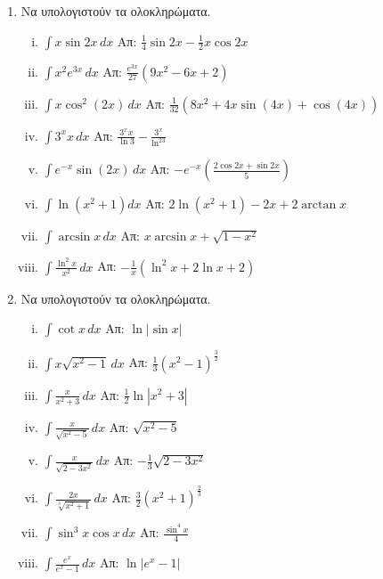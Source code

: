 \begin{enumerate}
  \item Να υπολογιστούν τα ολοκληρώματα.
    \begin{enumerate}[i)]
      \item $\int x\sin2x \, dx$ \hfill Απ: $\frac{1}{4}\sin2x-\frac{1}{2}x\cos2x$
      \item $\int x^2e^{3x} \, dx$ \hfill Απ: $\frac{e^{3x}}{27}(9x^2-6x+2)$
      \item $ \int x \cos^{2}{(2x)} \,{dx} $ 
        \hfill Απ: $ \frac{1}{32} (8x^{2}+4x \sin{(4x)} + \cos{(4x)}) $
      \item $\int 3^{x}x \, dx$ \hfill Απ: $\frac{3^xx}{\ln3}-\frac{3^x}{\ln^23}$
      \item $\int e^{-x}\sin(2x) \, dx$ 
        \hfill Απ: $-e^{-x}\left(\frac{2\cos2x+\sin2x}{5}\right)$
      \item $\int \ln(x^{2}+1) dx $ \hfill Απ: $2\ln(x^{2}+1)-2x+2\arctan x$
      \item $\int \arcsin x \, dx$ \hfill Απ: $x\arcsin x + \sqrt{1-x^2}$
      \item $\int \frac{\ln^2x}{x^2} \, dx$ \hfill Απ: $-\frac{1}{x}(\ln^2x+2\ln x+2)$
    \end{enumerate}

\enlargethispage{4\baselineskip}

  \item Να υπολογιστούν τα ολοκληρώματα.
    \begin{enumerate}[i)]
      \item $\int \cot x \, dx$ \hfill Απ: $\ln|\sin x|$ 
      \item $ \int x \sqrt{x^{2}-1} \,{dx} $ 
        \hfill Απ: $ \frac{1}{3} (x^{2}-1)^{\frac{3}{2}} $  
      \item $\int\frac{x}{x^2+3} \, dx$ \hfill Απ: $\frac{1}{2}\ln|x^2+3|$
      \item $\int\frac{x}{\sqrt{x^{2}-5}} \, dx$ \hfill Απ: $ \sqrt{x^{2}-5} $
      \item $\int\frac{x}{\sqrt{2-3x^{2}}} \, dx$ \hfill Απ: $ - \frac{1}{3}
      \sqrt{2-3x^{2}} $
      \item $ \int \frac{2x}{\sqrt[3]{x^{2}+1}} \,{dx} $ 
        \hfill Απ: $ \frac{3}{2} (x^{2}+1)^{\frac{2}{3}} $ 
      \item $\int \sin^3x\cos x \, dx$ \hfill Απ: $\frac{\sin^{4}x}{4}$
      \item $\int \frac{e^x}{e^x-1} \, dx$ \hfill Απ: $\ln|e^x-1|$
    \end{enumerate}
\end{enumerate}




